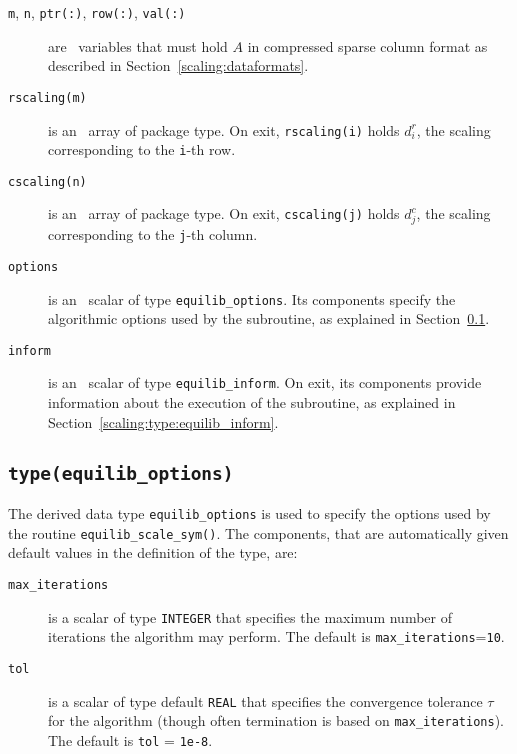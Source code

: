 \begin{description}

\item[\texttt{m}, \texttt{n}, \texttt{ptr(:)}, \texttt{row(:)}, \texttt{val(:)}] are \intentin\ variables that must hold $A$ in compressed sparse column format as described in Section~\ref{scaling:dataformats}.

\item[\texttt{rscaling(m)}] is an \intentout\ array of package type. On exit,
\texttt{rscaling(i)} holds $d^r_i$, the scaling corresponding to the
\texttt{i}-th row.

\item[\texttt{cscaling(n)}] is an \intentout\ array of package type. On exit,
\texttt{cscaling(j)} holds $d^c_j$, the scaling corresponding to the
\texttt{j}-th column.

\item[\texttt{options}] is an \intentin\ scalar of type \texttt{equilib\_options}. Its components specify the algorithmic options used by the subroutine, as explained in Section~\ref{scaling:type:equilib_options}.

\item[\texttt{inform}] is an \intentout\ scalar of type \texttt{equilib\_inform}. On exit, its components provide information about the execution of the subroutine, as explained in Section~\ref{scaling:type:equilib_inform}.

\end{description}

\subsection{\texttt{type(equilib\_options)}} \label{scaling:type:equilib_options}

The derived data type \texttt{equilib\_options} is used to specify the options
used by the routine \texttt{equilib\_scale\_sym()}. The components, that are
automatically given default values in the definition of the type, are:

\begin{description}

\item[\texttt{max\_iterations}] is a scalar of type \texttt{INTEGER} that specifies the maximum number of iterations the algorithm may perform. The default is \texttt{max\_iterations}=\texttt{10}.

\item[\texttt{tol}] is a scalar of type default \texttt{REAL} that specifies the convergence tolerance $\tau$ for the algorithm (though often termination is based on \texttt{max\_iterations}). The default is \texttt{tol} = \texttt{1e-8}.

\end{description}

